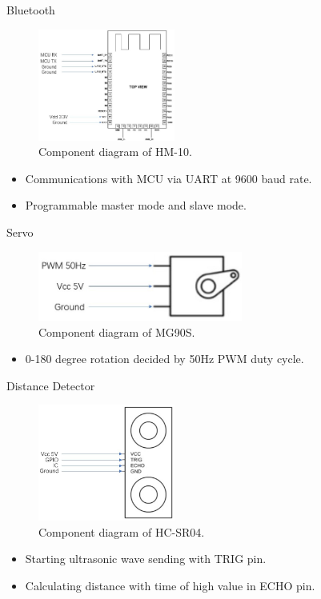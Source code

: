 \documentclass[12pt]{beamer}
\begin{document}
\begin{frame}{Bluetooth}
    \begin{figure}[H]
        \centering
        \includegraphics[width=0.4\textwidth]{HM10.jpg}
        \caption{Component diagram of HM-10.}
    \end{figure}
    \begin{itemize}
        \item Communications with MCU via UART at 9600 baud rate.
        \item Programmable master mode and slave mode.
    \end{itemize}
\end{frame}

\begin{frame}{Servo}
    \begin{figure}[H]
        \centering
        \includegraphics[width=0.6\textwidth]{servo.jpg}
        \caption{Component diagram of MG90S.}
    \end{figure}
    \begin{itemize}
        \item 0-180 degree rotation decided by 50Hz PWM duty cycle.
    \end{itemize}
\end{frame}

\begin{frame}{Distance Detector}
    \begin{figure}[H]
        \centering
        \includegraphics[width=0.4\textwidth]{SR.jpg}
        \caption{Component diagram of HC-SR04.}
    \end{figure}
    \begin{itemize}
        \item Starting ultrasonic wave sending with TRIG pin.
        \item Calculating distance with time of high value in ECHO pin.
    \end{itemize}
\end{frame}
\end{document}
